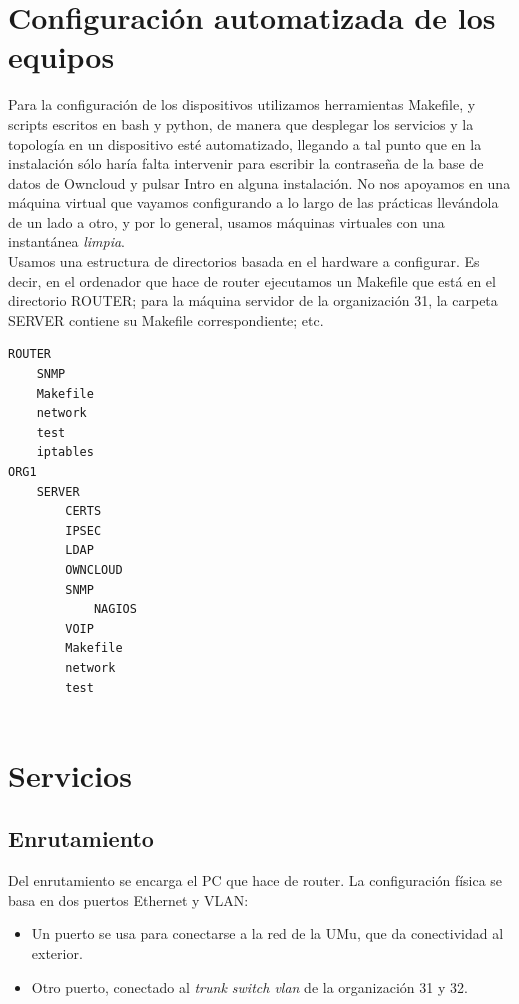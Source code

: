 \documentclass[]{article}
\begin{document}
\section{Configuración automatizada de los equipos}

Para la configuración de los dispositivos utilizamos herramientas Makefile, y scripts escritos en bash y python, de manera que desplegar los servicios y la topología en un dispositivo esté automatizado, llegando a tal punto que en la instalación sólo haría falta intervenir para escribir la contraseña de la base de datos de Owncloud y pulsar Intro en alguna instalación. No nos apoyamos en una máquina virtual que vayamos configurando a lo largo de las prácticas llevándola de un lado a otro, y por lo general, usamos máquinas virtuales con una instantánea \textit{limpia}.
\\

Usamos una estructura de directorios basada en el hardware a configurar. Es decir, en el ordenador que hace de router ejecutamos un Makefile que está en el directorio ROUTER; para la máquina servidor de la organización 31, la carpeta SERVER contiene su Makefile correspondiente; etc.

\begin{BVerbatim}
ROUTER
	SNMP
	Makefile
	network
	test
	iptables
ORG1
	SERVER
		CERTS
		IPSEC
		LDAP
		OWNCLOUD
		SNMP
			NAGIOS
		VOIP
		Makefile
		network
		test
		
\end{BVerbatim}

\hfill




\section{Servicios}

\subsection{Enrutamiento}

Del enrutamiento se encarga el PC que hace de router. La configuración física se basa en dos puertos Ethernet y VLAN:

\begin{itemize}
	\item Un puerto se usa para conectarse a la red de la UMu, que da conectividad al exterior.
	\item Otro puerto, conectado al \textit{trunk switch vlan} de la organización 31 y 32.
\end{itemize}
\end{document}
